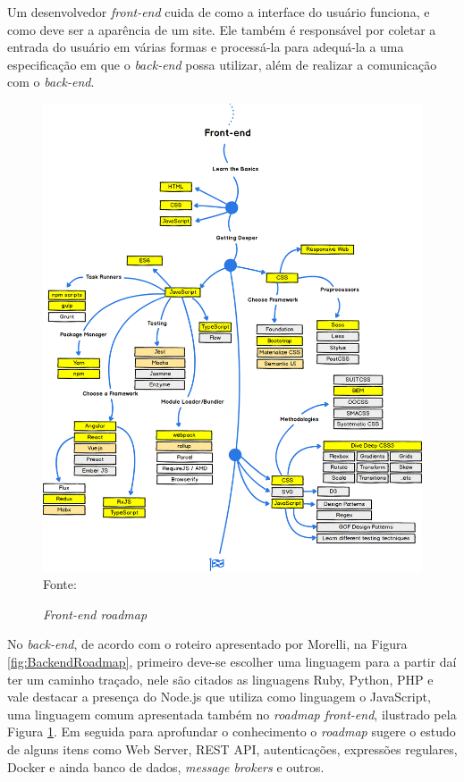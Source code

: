 \documentclass[
	12pt,				%
	openright,			%
	twoside,			%
	a4paper,			%
	english,			%
	brazil				%
	]{abntex2}
\begin{document}
Um desenvolvedor \textit{front-end} cuida de como a interface do usuário funciona, e como deve ser a aparência de um site. Ele também é responsável por coletar a entrada do usuário em várias formas e processá-la para adequá-la a uma especificação em que o \textit{back-end} possa utilizar, além de realizar a comunicação com o \textit{back-end}.

\begin{figure}[h!]
	\centering

	\caption{\textit{Front-end roadmap}} \label{fig:FrontendRoadmap}
    \includegraphics[scale=0.36]{frontend-roadmap} \\
    Fonte: {\cite{morelli_roadmap}}

\end{figure}

No \textit{back-end}, de acordo com o roteiro apresentado por Morelli\cite{morelli_roadmap}, na Figura \ref{fig:BackendRoadmap}, primeiro deve-se escolher uma linguagem para a partir daí ter um caminho traçado, nele são citados as linguagens Ruby, Python, PHP e vale destacar a presença do Node.js que utiliza como linguagem o JavaScript, uma linguagem comum apresentada também no \textit{roadmap front-end}, ilustrado pela Figura \ref{fig:FrontendRoadmap}. Em seguida para aprofundar o conhecimento o \textit{roadmap} sugere o estudo de alguns itens como Web Server, REST API, autenticações, expressões regulares, Docker e ainda banco de dados, \textit{message brokers} e outros.
\end{document}
